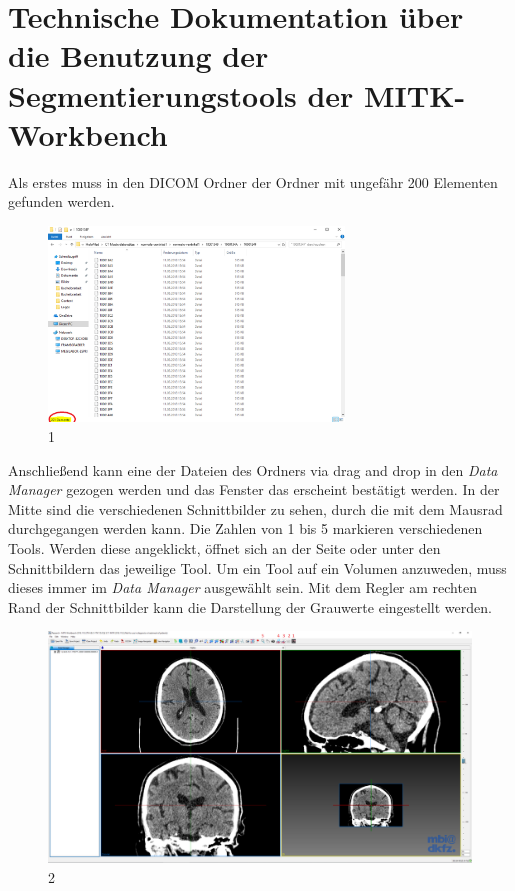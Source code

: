 
\Appendix
\label{ch:Appendix}



\section{Technische Dokumentation über die Benutzung der Segmentierungstools der MITK-Workbench}

Als erstes muss in den DICOM Ordner der Ordner mit ungefähr 200 Elementen gefunden werden.

\begin{figure}[H] 
\centering 
\includegraphics[width=0.7\textwidth]{Logos/MITK_Doku/1.PNG}
\caption{1} 
\label{fig:eins} 
\end{figure}

Anschließend kann eine der Dateien des Ordners via drag and drop in den \textit{Data Manager} gezogen werden und das Fenster das erscheint bestätigt werden.
\newline
In der Mitte sind die verschiedenen Schnittbilder zu sehen, durch die mit dem Mausrad durchgegangen werden kann.
\newline
Die Zahlen von 1 bis 5 markieren verschiedenen Tools. Werden diese angeklickt, öffnet sich an der Seite oder unter den Schnittbildern das jeweilige Tool. Um ein Tool auf ein Volumen anzuweden, muss dieses immer im \textit{Data Manager} ausgewählt sein.
\newline
Mit dem Regler am rechten Rand der Schnittbilder kann die Darstellung der Grauwerte eingestellt werden.

\begin{figure}[H] 
\centering 
\includegraphics[width=\textwidth]{Logos/MITK_Doku/2.PNG}
\caption{2} 
\label{fig:zwei} 
\end{figure}

